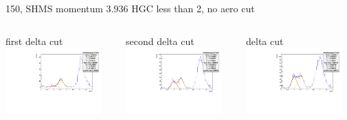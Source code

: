 \documentclass[aspectratio=169,xcolor=dvipsnames]{beamer}
\begin{document}
\begin{frame}{150, SHMS momentum 3.936}
HGC less than 2, no aero cut\\
\begin{columns}
\begin{column}[T]{0.33\textwidth}
first delta cut \\
\includegraphics[width = 0.9\textwidth]{results/pid/rftime/rftime_pos_150_0.pdf}
\end{column}
\begin{column}[T]{0.33\textwidth}
second delta cut \\
\includegraphics[width = 0.9\textwidth]{results/pid/rftime/rftime_pos_150_1.pdf}
\end{column}
\begin{column}[T]{0.33\textwidth}
delta cut \\
\includegraphics[width = 0.9\textwidth]{results/pid/rftime/rftime_pos_150_2.pdf}

\end{column}
\end{columns}
\end{frame}
\end{document}
